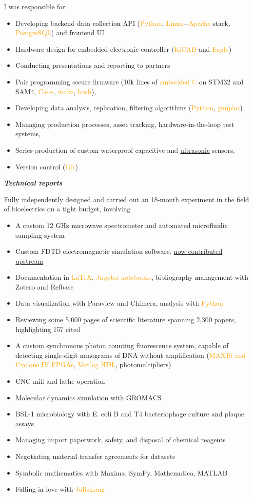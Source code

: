 \documentclass[fleqn,11pt]{article}
\newcommand{\ressection}[1]{\textbf{{\Large \textit{#1}}}\xrfill[0.1ex]{0.6pt}}
\newcommand{\sk}[1]{\textcolor{orange}{#1}}
\newcommand{\itemoptions}{\setlength{\itemindent}{-10pt} \setlength\itemsep{-1em}}
\begin{document}
I was responsible for:
\begin{itemize}\itemoptions
\item Developing backend data collection API (\sk{Python}, \sk{Linux}+\sk{Apache} stack, \sk{PostgreSQL}) and frontend UI
\item Hardware design for embedded electronic controller (\sk{KiCAD} and \sk{Eagle})
\item  Conducting presentations and reporting to partners
\item Pair programming secure firmware (10k lines of \sk{embedded C} on STM32 and SAM4, \sk{C++}, \sk{make}, \sk{bash}), 
\item Developing data analysis, replication, filtering algorithms (\sk{Python}, \sk{gnuplot})
\item Managing production processes, asset tracking, hardware-in-the-loop test systems, 
\item Series production of custom waterproof capacitive and \href{https://github.com/0xDBFB7/UltimateUltrasonicAmplifier}{ultrasonic} sensors,
\item Version control (\sk{Git})
\end{itemize}

\ressection{Technical reports}

Fully independently designed and carried out an 18-month experiment in the field of bioelectrics on a tight budget, involving
\begin{itemize}\itemoptions
	\item A custom 12 GHz microwave spectrometer and automated microfluidic sampling system
	\item Custom FDTD electromagnetic simulation software, \href{https://github.com/flaport/fdtd/pull/27}{now contributed upstream} 
	\item Documentation in \sk{LaTeX}, \sk{Jupyter notebooks}, bibliography management with Zotero and Refbase
	\item Data visualization with Paraview and Chimera, analysis with \sk{Python}
	\item Reviewing some 5,000 pages of scientific literature spanning 2,300 papers, highlighting 157 cited
	\item A custom synchronous photon counting fluorescence system, capable of detecting single-digit nanograms of DNA without amplification (\sk{MAX10 and Cyclone IV FPGAs}, \sk{Verilog HDL}, photomultipliers)
	\item CNC mill and lathe operation
	\item Molecular dynamics simulation with GROMACS
	\item BSL-1 microbiology with E. coli B and T4 bacteriophage culture and plaque assays
	\item Managing import paperwork, safety, and disposal of chemical reagents
	\item Negotiating material transfer agreements for datasets
	\item Symbolic mathematics with Maxima, SymPy, Mathematica, MATLAB
	\item Falling in love with \sk{JuliaLang}
\end{itemize}
\end{document}

